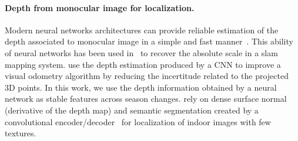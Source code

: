 \paragraph{Depth from monocular image for localization.} Modern neural networks architectures can provide reliable estimation of the depth associated to monocular image in a simple and fast manner~\citep{Eigen2014, Godard2017, Mahjourian2018}. This ability of neural networks has been used in~\citep{Tateno2017} to recover the absolute scale in a \ac{slam} mapping system. \citet{Loo2019} use the depth estimation produced by a CNN to improve a visual odometry algorithm by reducing the incertitude related to the projected 3D points. In this work, we use the depth information obtained by a neural network as stable features across season changes. \citet{Taira2019} rely on dense surface normal (derivative of the depth map) and semantic segmentation created by a convolutional encoder/decoder~\citep{Zamir2018} for localization of indoor images with few textures.